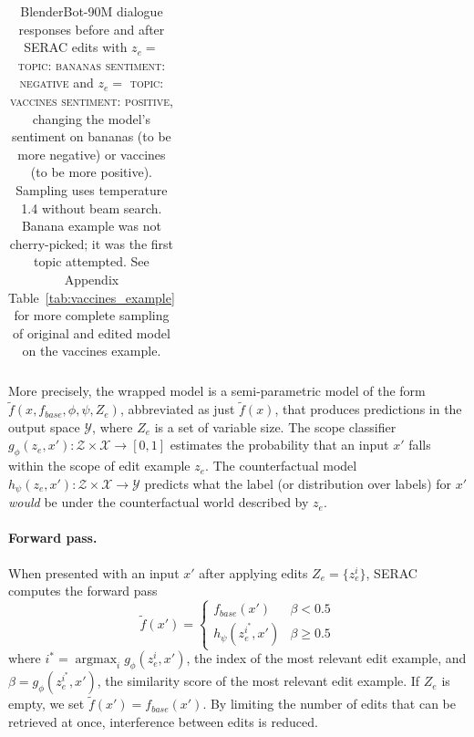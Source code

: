 \documentclass{article}
\newcommand{\basemodel}{f_{base}}
\newcommand{\semimodel}{\tilde{f}}
\newcommand{\cls}{g_\phi}
\newcommand{\rep}{h_\psi}
\newcommand{\inp}{\mathcal{X}}
\newcommand{\out}{\mathcal{Y}}
\newcommand{\name}{SERAC}
\newcommand{\edits}{Z_e}
\newcommand{\rawstring}[1]{\textsc{\footnotesize #1}}
\newcommand{\ze}[1][]{z_e^{#1}}
\newcommand{\xunk}[1][]{x'}
\DeclareMathOperator*{\argmax}{argmax}
\begin{document}
\begin{table}
{\begin{tabular}{lll}
        \bottomrule
    \end{tabular}}
    \caption{BlenderBot-90M dialogue responses before and after SERAC edits with $\ze=$ \rawstring{topic: bananas sentiment: negative} and $\ze=$ \rawstring{topic: vaccines sentiment: positive}, changing the model's sentiment on bananas (to be more negative) or vaccines (to be more positive). Sampling uses temperature 1.4 without beam search. Banana example was not cherry-picked; it was the first topic attempted. See Appendix Table~\ref{tab:vaccines_example} for more complete sampling of original and edited model on the vaccines example.}
    \label{tab:outputs}
\end{table}



More precisely, the wrapped model is a semi-parametric model of the form $\semimodel(x, \basemodel, \phi, \psi, \edits)$, abbreviated as just $\semimodel(x)$, that produces predictions in the output space $\mathcal{Y}$, where $\edits$ is a set of variable size. The scope classifier $\cls(\ze, \xunk) : \mathcal{Z} \times \inp  \rightarrow [0, 1]$ estimates the probability that an input $\xunk$ falls within the scope of edit example $\ze$. The counterfactual model $\rep(\ze, \xunk) : \mathcal{Z} \times \inp \rightarrow \out$ predicts what the label (or distribution over labels) for $\xunk$ \textit{would} be under the counterfactual world described by $\ze$. 

\paragraph{Forward pass.} When presented with an input $\xunk$ after applying edits $\edits = \{\ze[i]\}$, {\name} computes the forward pass
\begin{equation}
    \semimodel(\xunk) = 
    \begin{cases}
        \basemodel(\xunk) & \beta < 0.5 \\
        \rep(\ze[i^*], \xunk) & \beta \ge 0.5
    \end{cases}
\end{equation}
where $i^* = \argmax_i \cls(\ze[i], \xunk)$, the index of the most relevant edit example, and $\beta = \cls( \ze[i^*], \xunk)$, the similarity score of the most relevant edit example. If $\edits$ is empty, we set $\semimodel(\xunk) = \basemodel(\xunk)$. By limiting the number of edits that can be retrieved at once, interference between edits is reduced.
\end{document}
